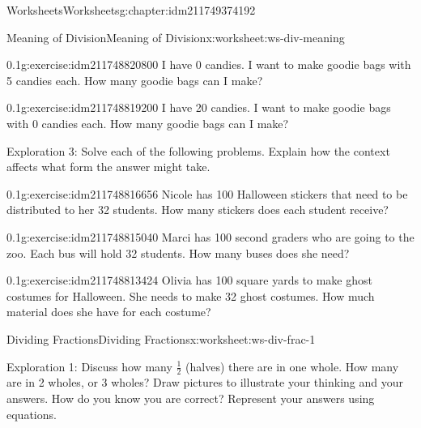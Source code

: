 \documentclass[twoside,11pt,]{book}
\begin{document}
\begin{chapterptx}{Worksheets}{}{Worksheets}{}{}{g:chapter:idm211749374192}
\begin{worksheet-section-numberless}{Meaning of Division}{}{Meaning of Division}{}{}{x:worksheet:ws-div-meaning}
\begin{introduction}{}
\end{introduction}%
\begin{divisionexercise}{5}{}{0.1}{g:exercise:idm211748820800}%
I have 0 candies.  I want to make goodie bags with 5 candies each.  How many goodie bags can I make?%
\end{divisionexercise}%
\begin{divisionexercise}{6}{}{0.1}{g:exercise:idm211748819200}%
I have 20 candies.  I want to make goodie bags with 0 candies each.  How many goodie bags can I make?%
\end{divisionexercise}%
\begin{introduction}{}%
Exploration 3: Solve each of the following problems. Explain how the context affects what form the answer might take.%
\end{introduction}%
\begin{divisionexercise}{7}{}{0.1}{g:exercise:idm211748816656}%
Nicole has 100 Halloween stickers that need to be distributed to her 32 students. How many stickers does each student receive?%
\end{divisionexercise}%
\begin{divisionexercise}{8}{}{0.1}{g:exercise:idm211748815040}%
Marci has 100 second graders who are going to the zoo. Each bus will hold 32 students. How many buses does she need?%
\end{divisionexercise}%
\begin{divisionexercise}{9}{}{0.1}{g:exercise:idm211748813424}%
Olivia has 100 square yards to make ghost costumes for Halloween. She needs to make 32 ghost costumes. How much material does she have for each costume?%
\end{divisionexercise}%
\end{worksheet-section-numberless}
\restoregeometry
%
%
\typeout{************************************************}
\typeout{************************************************}
%
\begin{worksheet-section-numberless}{Dividing Fractions}{}{Dividing Fractions}{}{}{x:worksheet:ws-div-frac-1}
\begin{introduction}{}%
Exploration 1: Discuss how many \(\frac{1}{2} \) (halves) there are in one whole. How many are in 2 wholes, or 3 wholes? Draw pictures to illustrate your thinking and your answers. How do you know you are correct? Represent your answers using equations.%
\end{introduction}%

\end{worksheet-section-numberless}
\end{chapterptx}
\end{document}
